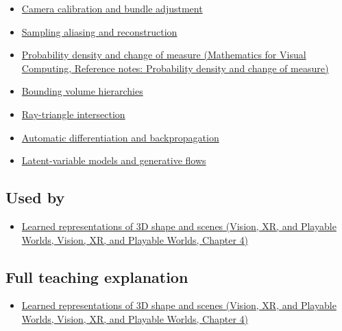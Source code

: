 \begin{itemize}
\tightlist
\item
  \hyperref[appendix-3ee9861904d5]{Camera calibration and bundle adjustment}
\item
  \hyperref[appendix-6a7869dd79a6]{Sampling aliasing and reconstruction}
\item
  \href{../02-Mathematics-for-Visual-Computing/main.pdf\#nameddest=appendix-4815cd87ab8b}{Probability density and change of measure (Mathematics for Visual Computing, Reference notes: Probability density and change of measure)}
\item
  \hyperref[appendix-0b426c47dd78]{Bounding volume hierarchies}
\item
  \hyperref[appendix-47ac1bd6d144]{Ray-triangle intersection}
\item
  \hyperref[appendix-40df0855b4a7]{Automatic differentiation and backpropagation}
\item
  \hyperref[appendix-2c568f05ee34]{Latent-variable models and generative flows}
\end{itemize}

\subsection{Used by}\label{appendix-c5b332e400e7-used-by}

\begin{itemize}
\tightlist
\item
  \href{../07-Vision-XR-and-Playable-Worlds/main.pdf\#nameddest=04-visual-computing-ii-ch034-learned-representations-of-3d-shape-and-scenes}{Learned representations of 3D shape and scenes (Vision, XR, and Playable Worlds, Vision, XR, and Playable Worlds, Chapter 4)}
\end{itemize}

\subsection{Full teaching explanation}\label{appendix-c5b332e400e7-full-teaching-explanation}

\begin{itemize}
\tightlist
\item
  \href{../07-Vision-XR-and-Playable-Worlds/main.pdf\#nameddest=04-visual-computing-ii-ch034-learned-representations-of-3d-shape-and-scenes}{Learned representations of 3D shape and scenes (Vision, XR, and Playable Worlds, Vision, XR, and Playable Worlds, Chapter 4)}
\end{itemize}


